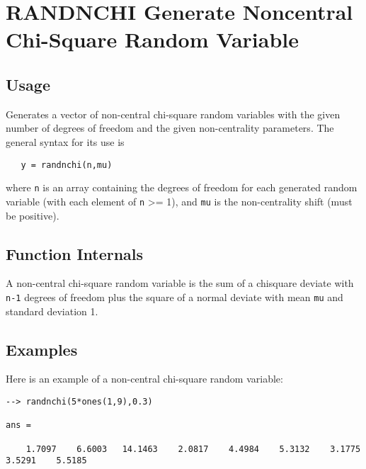 \section{RANDNCHI Generate Noncentral Chi-Square Random Variable}

\subsection{Usage}

Generates a vector of non-central chi-square random variables
with the given number of degrees of freedom and the given
non-centrality parameters.  The general syntax for its use is
\begin{verbatim}
   y = randnchi(n,mu)
\end{verbatim}
where \verb|n| is an array containing the degrees of freedom for
each generated random variable (with each element of \verb|n| >= 1),
and \verb|mu| is the non-centrality shift (must be positive).
\subsection{Function Internals}

A non-central chi-square random variable is the sum of a chisquare
deviate with \verb|n-1| degrees of freedom plus the square of a normal
deviate with mean \verb|mu| and standard deviation 1.
\subsection{Examples}

Here is an example of a non-central chi-square random variable:
\begin{verbatim}
--> randnchi(5*ones(1,9),0.3)

ans = 

    1.7097    6.6003   14.1463    2.0817    4.4984    5.3132    3.1775    3.5291    5.5185 
\end{verbatim}
